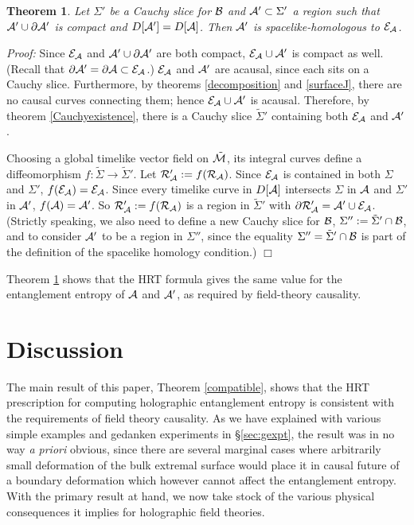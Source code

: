 \documentclass[12pt]{article}
\def\bulk{{\cal M}}
\def\bdy{{\cal B}}
\def\overM{\tilde \bulk}
\def\regA{{\cal A}}
\def\domdA{D[\regA]}
\def\extr{{\cal E}_\regA}
\def\homsurfA{{\cal R}_{\regA}}
\newtheorem{theorem}{Theorem}
\begin{document}
\begin{theorem}\label{wedgeobservable}Let $\Sigma'$ be a Cauchy slice for $\bdy$ and $\regA'\subset\Sigma'$ a region such that $\regA'\cup\partial\regA'$ is compact and $D[\regA']=D[\regA]$. Then $\regA'$ is spacelike-homologous to $\extr$.\end{theorem}


\emph{Proof:} Since $\extr$ and $\regA'\cup\partial\regA'$ are both compact, $\extr\cup\regA'$ is compact as well. (Recall that $\partial\regA'=\partial\regA\subset\extr$.) $\extr$ and $\regA'$ are acausal, since each sits on a Cauchy slice. Furthermore, by theorems \ref{decomposition} and \ref{surfaceJ}, there are no causal curves connecting them; hence $\extr\cup \regA'$ is acausal. Therefore, by theorem \ref{Cauchyexistence}, there is a Cauchy slice $\tilde\Sigma'$ containing both $\extr$ and $\regA'$.

Choosing a global timelike vector field on $\overM$, its integral curves define a diffeomorphism $f:\tilde\Sigma\to\tilde\Sigma'$. Let $\homsurfA':=f(\homsurfA)$. Since $\extr$ is contained in both $\Sigma$ and $\Sigma'$, $f(\extr)=\extr$. Since every timelike curve in $\domdA$ intersects $\Sigma$ in $\regA$ and $\Sigma'$ in $\regA'$, $f(\regA)=\regA'$. So $\homsurfA':=f(\homsurfA)$ is a region in $\tilde\Sigma'$ with $\partial\homsurfA'=\regA'\cup\extr$. (Strictly speaking, we also need to define a new Cauchy slice for $\bdy$, $\Sigma'':=\tilde\Sigma'\cap\bdy$, and to consider $\regA'$ to be a region in $\Sigma''$, since the equality  $\Sigma''=\tilde\Sigma'\cap\bdy$ is part of the definition of the spacelike homology condition.) $\Box$\bigskip

Theorem \ref{wedgeobservable} shows that the HRT formula gives the same value for the entanglement entropy of $\regA$ and $\regA'$, as required by field-theory causality.


\section{Discussion}
\label{sec:discuss}

The main result of this paper, Theorem \ref{compatible}, shows that the HRT prescription for computing holographic entanglement entropy \cite{Hubeny:2013gta} is consistent with the requirements of field theory causality. As we have explained with various simple examples and gedanken experiments in \S\ref{sec:gexpt}, the result was in no way \emph{a priori} obvious, since there are several marginal cases where arbitrarily small deformation of the bulk extremal surface would place it in causal future of a boundary deformation which however cannot affect the entanglement entropy. With the primary result at hand, we now take stock of the various physical consequences it implies for holographic field theories. 
\end{document}
